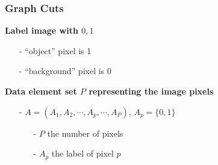 \documentclass[notheorems,mathserif,table,compress]{beamer}  %
\begin{document}
\begin{frame}
\frametitle{Graph Cuts}
	  {\textbf{Label image with ${0,1}$}}
	  \begin{itemize}
	  \item[-] ``object'' pixel is 1
	  \item[-] ``background'' pixel is 0 \\
	  \end{itemize}

{\textbf{Data element set $P$ representing the image pixels}}
\begin{itemize}
\item[-] $A=(A_{1},A_{2},\cdots, A_{p},\cdots, A_{P})$,	\hspace{0.1in} $A_{p}=\{ 0, 1 \}$
	\begin{itemize}
	\item[-] $P$ the number of pixels
	\item[-] $A_{p}$ the label of pixel $p$
	\end{itemize}
\end{itemize}
\end{frame}
\end{document}
